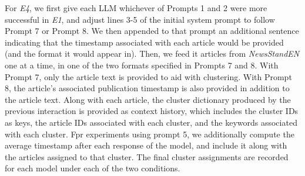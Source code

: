 For \emph{E4}, we first give each LLM whichever of Prompts 1 and 2 were more successful in \emph{E1}, and adjust lines 3-5 of the initial system prompt to follow Prompt 7 or Prompt 8.
We then appended to that prompt an additional sentence indicating that the timestamp associated with each article would be provided (and the format it would appear in).
Then, we feed it articles from \emph{NewsStandEN} one at a time, in one of the two formats specified in Prompts 7 and 8. 
With Prompt 7, only the article text is provided to aid with clustering.
With Prompt 8, the article's associated publication timestamp is also provided in addition to the article text.
Along with each article, the cluster dictionary produced by the previous interaction is provided as context history, which includes the cluster IDs as keys, the article IDs associated with each cluster, and the keywords associated with each cluster.
Fpr experiments using prompt 5, we additionally compute the average timestamp after each response of the model, and include it along with the articles assigned to that cluster.
The final cluster assignments are recorded for each model under each of the two conditions.



